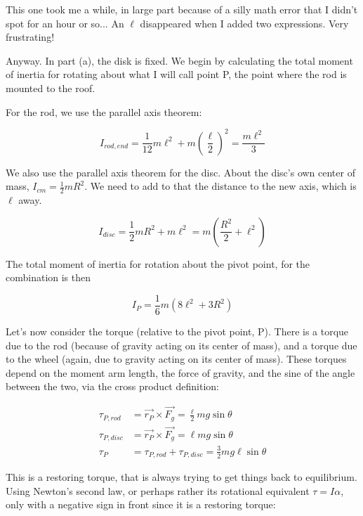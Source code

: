 \documentclass[12pt,a4paper]{report}
\begin{document}
This one took me a while, in large part because of a silly math error that I didn't spot for an hour or so... An $\ell$ disappeared when I added two expressions. Very frustrating!

Anyway. In part (a), the disk is fixed. We begin by calculating the total moment of inertia for rotating about what I will call point P, the point where the rod is mounted to the roof.

For the rod, we use the parallel axis theorem:

\begin{equation}
I_{rod,end} = \frac{1}{12} m \ell^2 + m \left(\frac{\ell}{2}\right)^2 = \frac{m \ell^2}{3}
\end{equation}

We also use the parallel axis theorem for the disc. About the disc's own center of mass, $I_{cm} = \frac{1}{2} m R^2$. We need to add to that the distance to the new axis, which is $\ell$ away.

\begin{equation}
I_{disc} = \frac{1}{2} m R^2 + m \ell^2 = m \left( \frac{R^2}{2} + \ell^2 \right)
\end{equation}

The total moment of inertia for rotation about the pivot point, for the combination is then

\begin{equation}
I_P = \frac{1}{6} m (8 \ell^2 + 3 R^2)
\end{equation}

Let's now consider the torque (relative to the pivot point, P). There is a torque due to the rod (because of gravity acting on its center of mass), and a torque due to the wheel (again, due to gravity acting on its center of mass). These torques depend on the moment arm length, the force of gravity, and the sine of the angle between the two, via the cross product definition:

\begin{align}
\tau_{P,rod}  &= \vec{r_P} \times \vec{F_g} = \frac{\ell}{2} m g \sin \theta\\
\tau_{P,disc} &= \vec{r_P} \times \vec{F_g} = \ell m g \sin \theta\\
\tau_P        &= \tau_{P,rod} + \tau_{P,disc} = \frac{3}{2} m g \ell \sin \theta
\end{align}

This is a restoring torque, that is always trying to get things back to equilibrium. Using Newton's second law, or perhaps rather its rotational equivalent $\tau = I \alpha$, only with a negative sign in front since it is a restoring torque:
\end{document}
